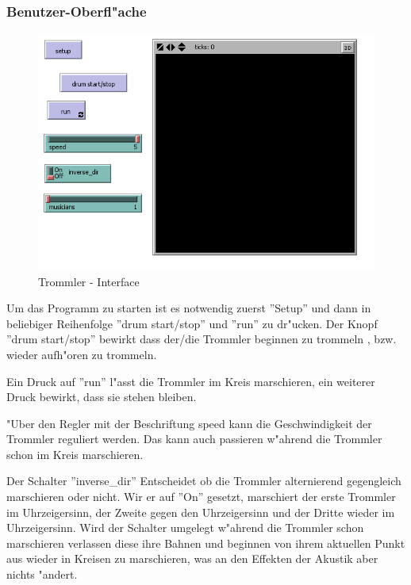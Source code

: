 \subsubsection{Benutzer-Oberfl"ache}

\begin{figure}[htb]
	\centering
		\includegraphics[scale=0.77]{fig/Trommler_interface.png}
	\caption{Trommler - Interface}
	\label{fig:Trommler.interface}
\end{figure}

Um das Programm zu starten ist es notwendig zuerst ''Setup'' und dann in 
beliebiger Reihenfolge ''drum start/stop'' und ''run'' zu dr"ucken. 
Der Knopf ''drum start/stop'' bewirkt dass der/die Trommler beginnen zu trommeln
, bzw. wieder aufh"oren zu trommeln. 

Ein Druck auf ''run'' l"asst die Trommler im Kreis marschieren, ein weiterer
Druck bewirkt, dass sie stehen bleiben. 

"Uber den Regler mit der Beschriftung speed kann die Geschwindigkeit der 
Trommler reguliert werden. Das kann auch passieren w"ahrend die Trommler schon
im Kreis marschieren.

Der Schalter ''inverse\_dir'' Entscheidet ob die Trommler alternierend gegengleich
marschieren oder nicht. Wir er auf ''On'' gesetzt, marschiert der erste Trommler
im Uhrzeigersinn, der Zweite gegen den Uhrzeigersinn und der Dritte wieder im
Uhrzeigersinn. Wird der Schalter umgelegt w"ahrend die Trommler schon marschieren
verlassen diese ihre Bahnen und beginnen von ihrem aktuellen Punkt aus wieder
in Kreisen zu marschieren, was an den Effekten der Akustik aber nichts "andert.

